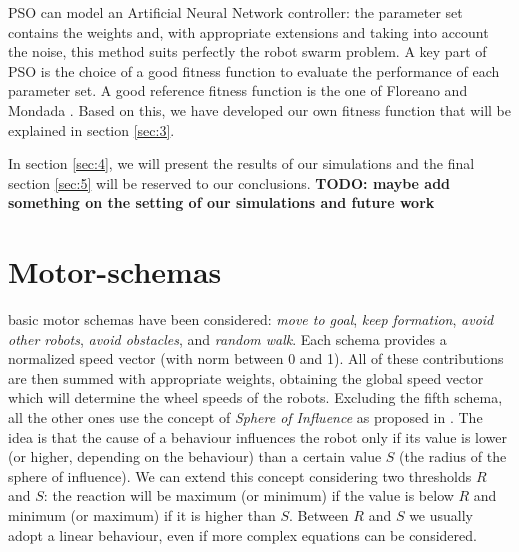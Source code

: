 \documentclass[journal]{IEEEtran}
\begin{document}
PSO can model an Artificial Neural Network controller: the parameter set contains the weights and, with appropriate extensions and taking into account the noise, this method suits perfectly the robot swarm problem.  
A key part of PSO is the choice of a good fitness function to evaluate the performance of each parameter set. A good reference fitness function is the one of Floreano and Mondada \cite{IEEEhowto:fitness_floreano_mondada}. Based on this, we have developed our own fitness function that will be explained in section \ref{sec:3}. 

In section \ref{sec:4}, we will present the results of our
simulations and the final section \ref{sec:5} will be reserved to our conclusions. 
\textbf{TODO: maybe add something on the setting of our simulations and future work}

\section{Motor-schemas}
\label{sec:2}
 basic motor schemas have been considered: \textit{move to goal}, \textit{keep formation}, \textit{avoid other robots}, \textit{avoid obstacles}, and \textit{random walk}. %
Each schema provides a normalized speed vector (with norm between
0 and 1). All of these contributions are then summed with appropriate weights, obtaining the
global speed vector which will determine the wheel speeds of the robots. 
Excluding the fifth schema, all the other ones use the concept of
\textit{Sphere of Influence} as proposed in
\cite{IEEEhowto:arkin_motor_schemas}. The idea is that the cause of a
behaviour influences the robot only if its value is lower (or higher, depending on the behaviour) than a certain value $S$ (the radius of the sphere of influence). We can extend this concept considering two thresholds $R$ and $S$: the reaction will be maximum (or minimum) if the value is below $R$ and minimum (or maximum) if it is higher than $S$. Between $R$ and $S$ we usually adopt a linear behaviour, even if more complex equations can be considered.
\end{document}

